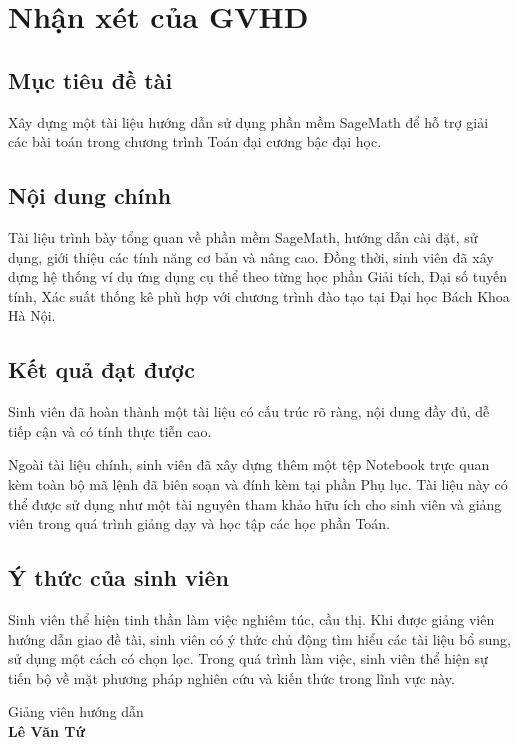 \chapter*{Nhận xét của GVHD}

\section*{Mục tiêu đề tài}

Xây dựng một tài liệu hướng dẫn sử dụng phần mềm SageMath để hỗ trợ giải các bài toán trong chương trình Toán đại cương bậc đại học.

\section*{Nội dung chính}

Tài liệu trình bày tổng quan về phần mềm SageMath, hướng dẫn cài đặt, sử dụng, giới thiệu các tính năng cơ bản và nâng cao. Đồng thời, sinh viên đã xây dựng hệ thống ví dụ ứng dụng cụ thể theo từng học phần Giải tích, Đại số tuyến tính, Xác suất thống kê phù hợp với chương trình đào tạo tại Đại học Bách Khoa Hà Nội.

\section*{Kết quả đạt được}

Sinh viên đã hoàn thành một tài liệu có cấu trúc rõ ràng, nội dung đầy đủ, dễ tiếp cận và có tính thực tiễn cao.

Ngoài tài liệu chính, sinh viên đã xây dựng thêm một tệp Notebook trực quan kèm toàn bộ mã lệnh đã biên soạn và đính kèm tại phần Phụ lục. Tài liệu này có thể được sử dụng như một tài nguyên tham khảo hữu ích cho sinh viên và giảng viên trong quá trình giảng dạy và học tập các học phần Toán.

\section*{Ý thức của sinh viên}

Sinh viên thể hiện tinh thần làm việc nghiêm túc, cầu thị. Khi được giảng viên hướng dẫn giao đề tài, sinh viên có ý thức chủ động tìm hiểu các tài liệu bổ sung, sử dụng một cách có chọn lọc. Trong quá trình làm việc, sinh viên thể hiện sự tiến bộ về mặt phương pháp nghiên cứu và kiến thức trong lĩnh vực này.

\begin{flushright}
	Giảng viên hướng dẫn\\
	\textbf{Lê Văn Tứ}
\end{flushright}